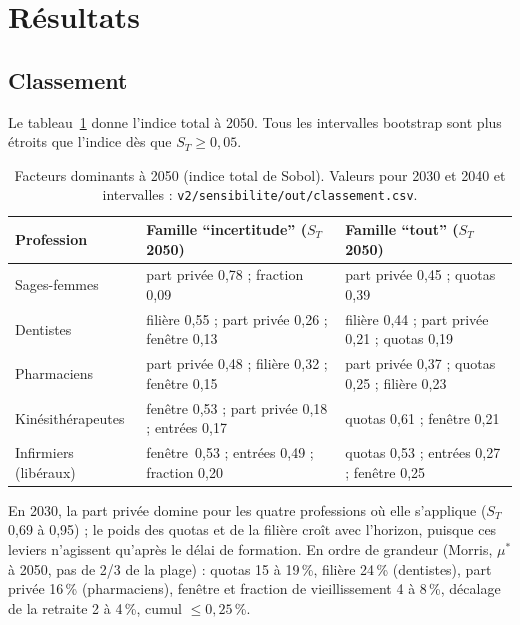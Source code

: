 \section{Résultats}\label{a5-sec:res}
\subsection{Classement}
Le tableau~\ref{a5-tab:st} donne l'indice total à 2050. Tous les intervalles bootstrap sont plus étroits que l'indice
dès que $S_T \ge 0{,}05$\mesure{}.

\begin{table}[h]\centering\small
\begin{tabular}{p{2.9cm}p{5.8cm}p{5.8cm}}
\toprule
Profession & Famille \enquote{incertitude} ($S_T$ 2050) & Famille \enquote{tout} ($S_T$ 2050) \\
\midrule
Sages-femmes & part privée 0,78\mesure{} ; fraction 0,09\mesure{} & part privée 0,45\mesure{} ; quotas 0,39\mesure{} \\
Dentistes & filière 0,55\mesure{} ; part privée 0,26\mesure{} ; fenêtre 0,13\mesure{} & filière 0,44\mesure{} ; part privée 0,21\mesure{} ; quotas 0,19\mesure{} \\
Pharmaciens & part privée 0,48\mesure{} ; filière 0,32\mesure{} ; fenêtre 0,15\mesure{} & part privée 0,37\mesure{} ; quotas 0,25\mesure{} ; filière 0,23\mesure{} \\
Kinésithérapeutes & fenêtre 0,53\mesure{} ; part privée 0,18\mesure{} ; entrées 0,17\mesure{} & quotas 0,61\mesure{} ; fenêtre 0,21\mesure{} \\
Infirmiers (libéraux) & fenêtre~0,53\mesure{} ; entrées 0,49\mesure{} ; fraction 0,20\mesure{} & quotas 0,53\mesure{} ; entrées 0,27\mesure{} ; fenêtre 0,25\mesure{} \\
\bottomrule
\end{tabular}
\caption{Facteurs dominants à 2050 (indice total de Sobol). Valeurs pour 2030 et 2040 et intervalles :
\texttt{v2/sensibilite/out/classement.csv}.}\label{a5-tab:st}
\end{table}

En 2030, la part privée domine pour les quatre professions où elle s'applique ($S_T$ 0,69 à 0,95\mesure{}) ; le
poids des quotas et de la filière croît avec l'horizon, puisque ces leviers n'agissent qu'après le délai de
formation. En ordre de grandeur (Morris, $\mu^*$ à 2050, pas de 2/3 de la plage) : quotas 15 à 19\,\%\mesure{},
filière 24\,\%\mesure{} (dentistes), part privée 16\,\%\mesure{} (pharmaciens), fenêtre et fraction de
vieillissement 4 à 8\,\%\mesure{}, décalage de la retraite 2 à 4\,\%\mesure{}, cumul $\le 0{,}25$\,\%\mesure{}.

